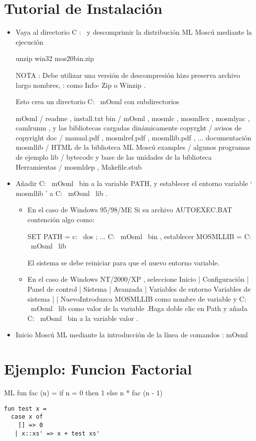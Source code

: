 \documentclass[11pt]{article} %
\begin{document}
\section{\color{red}Tutorial de Instalación}

\begin{itemize}
\item Vaya al directorio C : \ y descomprimir la distribución ML Moscú
mediante la ejecución

unzip win32 mos20bin.zip

NOTA : Debe utilizar una versión de descompresión hizo preserva archivo largo
nombres, : como Info- Zip o Winzip .

Esto crea un directorio C: \ mOsml con subdirectorios

mOsml / readme , install.txt
bin / mOsml , mosmlc , mosmllex , mosmlyac , camlrunm ,
y las bibliotecas cargadas dinámicamente
copyrght / avisos de copyright
doc / manual.pdf , mosmlref.pdf , mosmllib.pdf , ...
documentación mosmllib / HTML de la biblioteca ML Moscú
examples / algunos programas de ejemplo
lib / bytecode y base de las unidades de la biblioteca
Herramientas / mosmldep , Makefile.stub

\item Añadir C: \ mOsml \ bin a la variable PATH, y establecer el entorno
     variable ` mosmllib ' a C: \ mOsml \ lib .

\begin{itemize}
\item En el caso de Windows 95/98/ME Si su archivo AUTOEXEC.BAT contención algo como:

\space \space SET PATH = c: \ dos ; ... C: \ mOsml \ bin , establecer MOSMLLIB = C: \ mOsml \ lib

El sistema se debe reiniciar para que el nuevo entorno variable.

\item En el caso de Windows NT/2000/XP , seleccione Inicio | Configuración | Panel de control | Sistema | Avanzada | Variables de entorno Variables de sistema | | NuevoIntroduzca MOSMLLIB como nombre de variable y C: \ mOsml \ lib como valor de la variable .Haga doble clic en Path y añada C: \ mOsml \ bin a la variable valor .

\end{itemize}

\item Inicio Moscú ML mediante la introducción de la línea de comandos : mOsml

\end{itemize}

\section{\color{red}Ejemplo: Funcion Factorial}

ML
fun fac (n) =
if n = 0 then 1
else n * fac (n - 1)


\lstset{language=ML}          %

\begin{lstlisting}[frame=single]  % Start your code-block
fun test x =
  case x of
    [] => 0
   | x::xs' => x + test xs'
\end{lstlisting}
\end{document}

